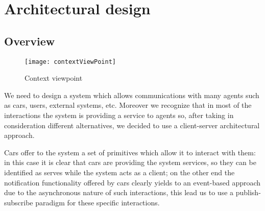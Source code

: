 \section{Architectural design}

\subsection{Overview}

\begin{figure}[h!]
	\centering
	\texttt{[image: contextViewPoint]}
	\caption{
		\label{fig:contextViewPoint} 
		Context viewpoint
	}
\end{figure}
\clearpage



We need to design a system which allows communications with many agents such as cars, users, external systems, etc.
Moreover we recognize that in most of the interactions the system is providing a service to agents so, after taking in consideration different alternatives, we decided to use a client-server architectural approach.

Cars offer to the system a set of primitives which allow it to interact with them: in this case it is clear that cars are providing the system services, so they can be identified as serves while the system acts as a client; on the other end the notification functionality offered by cars clearly yields to an event-based approach due to the asynchronous nature of such interactions, this lead us to use a publish-subscribe paradigm for these specific interactions.

